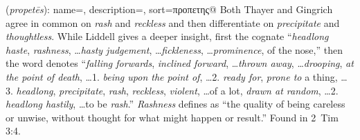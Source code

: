\item[Rashness,]

(\textit{propetēs}):
{
    name=,
    description={},
    sort=προπετης@
}
Both Thayer and Gingrich agree in common on \emph{rash} and \emph{reckless} and then differentiate on \emph{precipitate} and \emph{thoughtless}. While Liddell gives a deeper insight, first the cognate  ``\emph{headlong haste}, \emph{rashness}, \ldots \emph{hasty judgement}, \ldots \emph{fickleness}, \ldots \emph{prominence}, of the nose,'' then the word denotes ``\emph{falling forwards}, \emph{inclined forward}, \ldots \emph{thrown away}, \ldots \emph{drooping}, \emph{at the point of death}, \ldots 1. \emph{being upon the point of}, \ldots 2. \emph{ready for}, \emph{prone to} a thing, \ldots 3. \emph{headlong}, \emph{precipitate}, \emph{rash}, \emph{reckless}, \emph{violent}, \ldots of a lot, \emph{drawn at random}, \ldots 2. \emph{headlong hastily}, \ldots to be \emph{rash}.'' 
\emph{Rashness} defines as ``the quality of being careless or unwise, without thought for what might happen or result.''
Found in 2~Tim 3:4.
